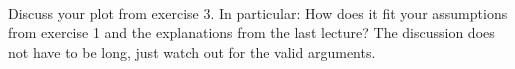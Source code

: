  \\
Discuss your plot from exercise 3.
In particular: How does it fit your assumptions from exercise 1 and the
explanations from the last lecture?
The discussion does not have to be long, just watch out for the valid arguments.
